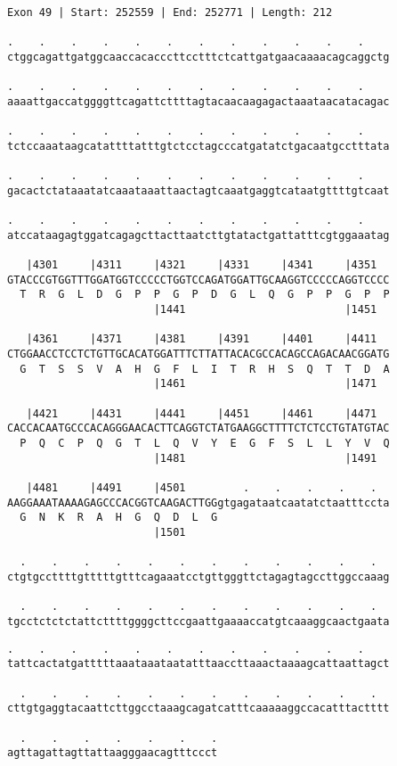 \documentclass{article}
\begin{document}
\begin{Verbatim}[fontfamily=courier]
Exon 49 | Start: 252559 | End: 252771 | Length: 212

.    .    .    .    .    .    .    .    .    .    .    .    
ctggcagattgatggcaaccacacccttcctttctcattgatgaacaaaacagcaggctg

.    .    .    .    .    .    .    .    .    .    .    .    
aaaattgaccatggggttcagattcttttagtacaacaagagactaaataacatacagac

.    .    .    .    .    .    .    .    .    .    .    .    
tctccaaataagcatattttatttgtctcctagcccatgatatctgacaatgcctttata

.    .    .    .    .    .    .    .    .    .    .    .    
gacactctataaatatcaaataaattaactagtcaaatgaggtcataatgttttgtcaat

.    .    .    .    .    .    .    .    .    .    .    .    
atccataagagtggatcagagcttacttaatcttgtatactgattatttcgtggaaatag

   |4301     |4311     |4321     |4331     |4341     |4351  
GTACCCGTGGTTTGGATGGTCCCCCTGGTCCAGATGGATTGCAAGGTCCCCCAGGTCCCC
  T  R  G  L  D  G  P  P  G  P  D  G  L  Q  G  P  P  G  P  P
                       |1441                         |1451  

   |4361     |4371     |4381     |4391     |4401     |4411  
CTGGAACCTCCTCTGTTGCACATGGATTTCTTATTACACGCCACAGCCAGACAACGGATG
  G  T  S  S  V  A  H  G  F  L  I  T  R  H  S  Q  T  T  D  A
                       |1461                         |1471  

   |4421     |4431     |4441     |4451     |4461     |4471  
CACCACAATGCCCACAGGGAACACTTCAGGTCTATGAAGGCTTTTCTCTCCTGTATGTAC
  P  Q  C  P  Q  G  T  L  Q  V  Y  E  G  F  S  L  L  Y  V  Q
                       |1481                         |1491  

   |4481     |4491     |4501         .    .    .    .    .  
AAGGAAATAAAAGAGCCCACGGTCAAGACTTGGgtgagataatcaatatctaatttccta
  G  N  K  R  A  H  G  Q  D  L  G                           
                       |1501                                

  .    .    .    .    .    .    .    .    .    .    .    .  
ctgtgccttttgtttttgtttcagaaatcctgttgggttctagagtagccttggccaaag

  .    .    .    .    .    .    .    .    .    .    .    .  
tgcctctctctattcttttggggcttccgaattgaaaaccatgtcaaaggcaactgaata

\end{Verbatim}
\newpage
\begin{Verbatim}[fontfamily=courier]
  .    .    .    .    .    .    .    .    .    .    .    .  
tattcactatgatttttaaataaataatatttaaccttaaactaaaagcattaattagct

  .    .    .    .    .    .    .    .    .    .    .    .  
cttgtgaggtacaattcttggcctaaagcagatcatttcaaaaaggccacatttactttt

  .    .    .    .    .    .    .
agttagattagttattaagggaacagtttccct
\end{Verbatim}
\end{document}
